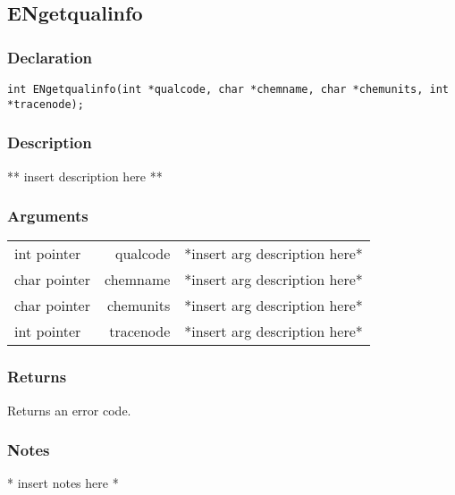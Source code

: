 \subsection{ENgetqualinfo}
\subsubsection{Declaration}
\begin{lstlisting}
int ENgetqualinfo(int *qualcode, char *chemname, char *chemunits, int *tracenode);
\end{lstlisting}
\subsubsection{Description}
** insert description here **
\subsubsection{Arguments}
\begin{tabular}{l r p{11cm} }
int pointer&qualcode&*insert arg description here* \\[6pt]
char pointer&chemname&*insert arg description here* \\[6pt]
char pointer&chemunits&*insert arg description here* \\[6pt]
int pointer&tracenode&*insert arg description here* \\[6pt]
\end{tabular}
\subsubsection{Returns}
Returns an error code.
\subsubsection{Notes}
* insert notes here *